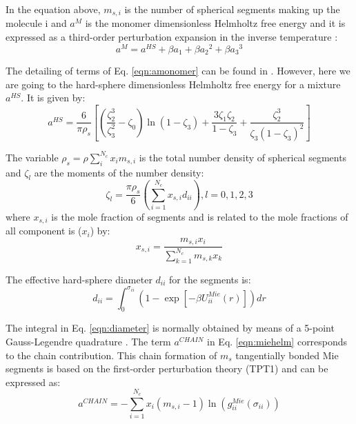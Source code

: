 	In the equation above, $m_{s,i}$ is the number of spherical segments making up the molecule i and $a^{M}$  is the monomer dimensionless Helmholtz free energy and it is expressed as a third-order perturbation expansion in the inverse temperature \cite{bh1976}:
	\begin{equation}
	a^{M} = a^{HS}+\beta{a_{1}}+\beta{a_{2}}^2+\beta{a_{3}}^3 
	\label{eqn:aM}
	\end{equation}
	
	The detailing of terms of Eq. \eqref{eqn:amonomer} can be found in . However, here we are going to  the hard-sphere dimensionless Helmholtz free energy for a mixture $a^{HS}$. It is given by:
	\begin{equation}
	a^{HS} = \frac{6}{\pi\rho_{s}}\left[\left(\frac{\zeta^3_2}{\zeta^2_3}-\zeta_0 \right)\ln(1-\zeta_3)+\frac{3\zeta_{1}\zeta_{2}}{1-\zeta_3}+ \frac{\zeta^3_2}{\zeta_{3}(1-\zeta_3)^2}\right]
	\label{eqn:hs}
	\end{equation}
	
	The variable $\rho_{s}=\rho\sum_{i}^{N_c} x_{i}m_{s,i}$ is the total number density of spherical segments and $\zeta_l$ are the moments of the number density:
	\begin{equation}
	\zeta_l = \frac{\pi\rho_s}{6}\left(\sum_{i=1}^{N_c} x_{s,i}d_{ii} \right), l = 0,1,2,3
	\label{eqn:zetal}
	\end{equation}
	where $x_{s,i}$ is the mole fraction of segments and is related to the mole fractions of all component is ($x_i$) by:
	\begin{equation}
	x_{s,i} = \frac{m_{s,i}x_i}{\sum_{k=1}^{N_c} m_{s,k}x_{k} }
	\label{eqn:xsi}
	\end{equation}
	
	
	The effective hard-sphere diameter $d_{ii}$ for the segments is:
	\begin{equation}
	d_{ii} =\int_{0}^{\sigma_{ii}} \left ( 1 - \exp \left [-\beta U^{Mie}_{ii}(r) \right ] \right ) dr
	\label{eqn:diameter}
	\end{equation}
	
	
	The integral in Eq. \eqref{eqn:diameter} is normally obtained by means of a 5-point Gauss-Legendre quadrature \cite{papa2014}. The term $a^{CHAIN}$ in Eq. \ref{eqn:miehelm} corresponds to the chain contribution. This chain formation of $m_{s}$ tangentially bonded Mie segments is based on the first-order perturbation theory (TPT1)  \cite{papa2014} and can be expressed as:
	\begin{equation}
	a^{CHAIN} =-\sum_{i=1}^{N_{c}} x_{i}(m_{s,i} - 1)\ln \left(g_{ii}^{Mie}(\sigma_{ii}) \right)
	\label{eqn:achain}
	\end{equation}
	
